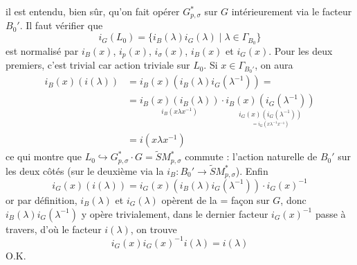 \begin{enumerate}
il est entendu, bien sûr, qu'on fait opérer
$G_{p,\sigma}^*$ sur $G$ intérieurement via le
facteur $B_0'$. Il faut vérifier que
$$ i_G(L_0) = \{ i_B(\lambda) i_G(\lambda) \mid \lambda \in \Gamma_{B_0} \} $$
est normalisé par  $i_B(x)$, $i_p(x)$, $i_\sigma(x)$,
$i_B(x)$ et $i_G(x)$. Pour les deux premiers,
c'est trivial car action triviale sur $L_0$.
Si $x \in \Gamma_{B_0'}$, on aura
$$
\begin{aligned}
i_B(x)(i(\lambda)) &= i_B(x) \left(i_B(\lambda) i_G(\lambda^{-1})\right) = \\
&= \underset{i_B(x\lambda x^{-1})}{i_B(x)(i_B(\lambda))} \cdot \underset{\underset{= i_G(x\lambda^{-1}x^{-1})}{i_G(x)(i_G(\lambda^{-1}))}}{i_B(x)(i_G(\lambda^{-1}))} \\
&= i(x\lambda x^{-1})
\end{aligned}
$$
ce qui montre que $L_0 \hookrightarrow G_{p,\sigma}^* \cdot G = \widetilde{S} M_{p,\sigma}^*$
commute : l'action naturelle de $B_0'$ sur
les deux côtés (sur le deuxième via la
$i_B : B_0' \to \widetilde{S} M_{p,\sigma}^*$). Enfin
$$ i_G(x)(i(\lambda)) = i_G(x)(i_B(\lambda) i_G(\lambda^{-1})) \cdot i_G(x)^{-1} $$
or par définition, $i_B(\lambda)$ et $i_G(\lambda)$ opèrent
de la = façon sur $G$, donc $i_B(\lambda) i_G(\lambda^{-1})$
y opère trivialement, dans le dernier facteur
$i_G(x)^{-1}$ passe à travers, d'où le facteur $i(\lambda)$, on trouve
$$ i_G(x) i_G(x)^{-1} i(\lambda) = i(\lambda) $$
O.K.

\newpage



\end{enumerate}

